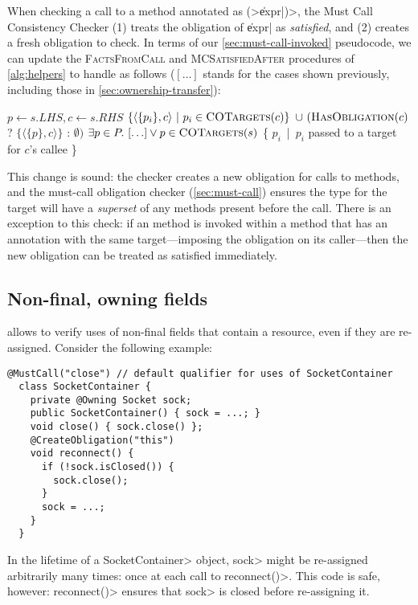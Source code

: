 When checking a call to a method annotated as
\CreateObligation\<(>\|expr|\<)>, the Must Call Consistency Checker
(1) treats the \MustCall
obligation of \|expr| as \emph{satisfied},
and (2) creates a fresh obligation to check.
%
In terms of our \cref{sec:must-call-invoked} pseudocode,
we can update the \textsc{FactsFromCall} and \textsc{MCSatisfiedAfter} procedures of
\cref{alg:helpers} to handle \CreateObligation as follows ($[\ldots]$ stands for the cases shown previously,
including those in \cref{sec:ownership-transfer}):
\begin{algorithmic}
  \State $p \gets s.LHS, c \gets s.RHS$
  \State \Return $\{ \langle \{ p_i \}, c \rangle\ |\ p_i \in \textsc{COTargets}(c) \}$ \newline
  \hspace*{5em} $\cup\ (\textsc{HasObligation}(c)$ ? $\{ \langle \{ p \}, c \rangle \}$ : $\emptyset)$
  \EndProcedure
  \State \Return $\exists p \in P .\ [\ldots] \vee p \in \textsc{COTargets}(s)$
  \EndProcedure
  \State \Return \{ $p_i$\ |\ $p_i$ passed to a \CreateObligation target for $c$'s callee \}
  \EndProcedure
\end{algorithmic}
\noindent
This change is sound: the checker creates a new obligation for calls to
\CreateObligation methods, and the must-call obligation checker (\cref{sec:must-call}) ensures the
\MustCall type for the target will have a \emph{superset} of any methods present
before the call.
There is an exception to this check: if an \CreateObligation
method is invoked within a method that has an \CreateObligation annotation
with the same target---imposing the obligation on its caller---then
the new obligation can be treated as satisfied immediately.

\subsection{Non-final, owning fields}
\label{sec:non-final-owning}

\CreateObligation allows \Tool to verify uses of non-final fields
that contain a resource, even if they are re-assigned. Consider
the following example:

\begin{lstlisting}[frame=tb,belowskip=3mm]
  @MustCall("close") // default qualifier for uses of SocketContainer
  class SocketContainer {
    private @Owning Socket sock;
    public SocketContainer() { sock = ...; } 
    void close() { sock.close() };
    @CreateObligation("this")
    void reconnect() {
      if (!sock.isClosed()) {
        sock.close();
      }
      sock = ...;
    }
  }
\end{lstlisting}
In the lifetime of a \<SocketContainer> object, \<sock>
might be re-assigned arbitrarily many times: once at each
call to \<reconnect()>. This code is safe, however: \<reconnect()>
ensures that \<sock> is closed before re-assigning it.

